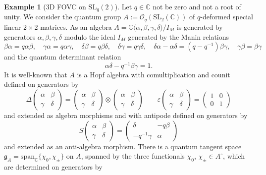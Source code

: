 \documentclass{article}
\theoremstyle{definition}
\newtheorem{example}[thm]{Example}
\begin{document}
	\begin{example}[3D FOVC on $\mathrm{SL}_q(2)$]\label{ex:SL2:FOVC}
		Let $q\in\mathbb{C}$ not be zero and not a root of unity.
		We consider the quantum group $A:=\mathcal{O}_q(\mathrm{SL}_2(\mathbb{C}))$ of $q$-deformed special linear $2\times 2$-matrices. As an algebra $A=\mathbb{C}\langle\alpha,\beta,\gamma,\delta\rangle/I_M$ is generated by generators $\alpha,\beta,\gamma,\delta$ modulo the ideal $I_M$ generated by the Manin relations
		\begin{equation}\label{manin-r}
			\beta\alpha=q\alpha\beta,\quad
			\gamma\alpha=q\alpha\gamma,\quad
			\delta\beta=q\beta\delta,\quad
			\delta\gamma=q\gamma\delta,\quad
			\delta\alpha-\alpha\delta=(q-q^{-1})\beta\gamma,\quad
			\gamma\beta=\beta\gamma
		\end{equation}
		and the quantum determinant relation
		$$
		\alpha\delta-q^{-1}\beta\gamma=1.
		$$
		It is well-known \cite{frt} that $A$ is a Hopf algebra with comultiplication and counit defined on generators by
		$$
		\Delta\begin{pmatrix}
			\alpha & \beta\\
			\gamma & \delta
		\end{pmatrix}=\begin{pmatrix}
			\alpha & \beta\\
			\gamma & \delta
		\end{pmatrix}\otimes\begin{pmatrix}
			\alpha & \beta\\
			\gamma & \delta
		\end{pmatrix}\qquad
		\varepsilon\begin{pmatrix}
			\alpha & \beta\\
			\gamma & \delta
		\end{pmatrix}=\begin{pmatrix}
			1 & 0\\
			0 & 1
		\end{pmatrix}
		$$
		and extended as algebra morphisms and with antipode defined on generators by
		$$
		S\begin{pmatrix}
			\alpha & \beta\\
			\gamma & \delta
		\end{pmatrix}=\begin{pmatrix}
			\delta & -q\beta\\
			-q^{-1}\gamma & \alpha
		\end{pmatrix}
		$$
		and extended as an anti-algebra morphism. There is a quantum tangent space $\mathfrak{g}_A=\mathrm{span}_\mathbb{C}\{\chi_0,\chi_\pm\}$ on $A$, spanned by the three functionals $\chi_0$, $\chi_\pm\in A^\circ$, which are determined on generators by

\end{example}
\end{document}
